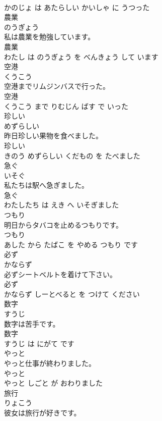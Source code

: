 \documentclass[8pt]{extreport}
\begin{document}
\begin{CJK}{UTF8}{min}
\\	かのじょ は あたらしい かいしゃ に うつった			
\\	農業	
\\	のうぎょう			
\\	私は農業を勉強しています。	
\\	農業 
\\	わたし は のうぎょう を べんきょう して います			
\\	空港	
\\	くうこう			
\\	空港までリムジンバスで行った。	
\\	空港 
\\	くうこう まで りむじん ばす で いった			
\\	珍しい	
\\	めずらしい			
\\	昨日珍しい果物を食べました。	
\\	珍しい 
\\	きのう めずらしい くだもの を たべました			
\\	急ぐ	
\\	いそぐ			
\\	私たちは駅へ急ぎました。	
\\	急ぐ 
\\	わたしたち は えき へ いそぎました			
\\	つもり	
\\	明日からタバコを止めるつもりです。	
\\	つもり 
\\	あした から たばこ を やめる つもり です			
\\	必ず	
\\	かならず			
\\	必ずシートベルトを着けて下さい。	
\\	必ず 
\\	かならず しーとべると を つけて ください			
\\	数字	
\\	すうじ			
\\	数字は苦手です。	
\\	数字 
\\	すうじ は にがて です			
\\	やっと	
\\	やっと仕事が終わりました。	
\\	やっと 
\\	やっと しごと が おわりました			
\\	旅行	
\\	りょこう			
\\	彼女は旅行が好きです。	

\end{CJK}
\end{document}
